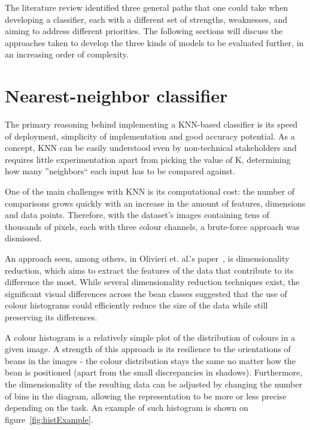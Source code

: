 The literature review identified three general paths that one could take when developing a classifier, each with a different
set of strengths, weaknesses, and aiming to address different priorities.
The following sections will discuss the approaches taken to develop the three kinds of models to be evaluated further, in an
increasing order of complexity.


\section{Nearest-neighbor classifier}
\label{sec:knn-classifier}
The primary reasoning behind implementing a KNN-based classifier is its speed of deployment, simplicity of implementation
and good accuracy potential.
As a concept, KNN can be easily understood even by non-technical stakeholders and requires little experimentation apart
from picking the value of K, determining how many ''neighbors`` each input has to be compared against.

One of the main challenges with KNN is its computational cost: the number of comparisons grows quickly with an increase
in the amount of features, dimensions and data points.
Therefore, with the dataset's images containing tens of thousands of pixels, each with three colour channels, a brute-force
approach was dismissed.

An approach seen, among others, in Olivieri et. al.'s paper~\cite{hyperspectralGreenOliveri}, is dimensionality reduction,
which aims to extract the features of the data that contribute to its difference the most.
While several dimensionality reduction techniques exist, the significant visual differences across the bean classes suggested
that the use of colour histograms could efficiently reduce the size of the data while still preserving its differences.

A colour histogram is a relatively simple plot of the distribution of colours in a given image.
A strength of this approach is its resilience to the orientations of beans in the images - the colour distribution stays
the same no matter how the bean is positioned (apart from the small discrepancies in shadows).
Furthermore, the dimensionality of the resulting data can be adjusted by changing the number of bins in the diagram, allowing
the representation to be more or less precise depending on the task.
An example of such histogram is shown on figure~\ref{fig:histExample}.


